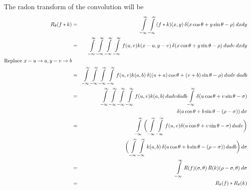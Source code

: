 \documentclass[12pt]{article}
\begin{document}
The radon transform of the convolution will be
\begin{eqnarray*}
	R_\theta(f*k) &=& \int \limits_{-\infty}^\infty \int \limits_{-\infty}^ \infty (f*k)(x, y)\, \delta(x \cos \theta + y \sin \theta - \rho)\: dxdy\\
	&=& \int \limits_{-\infty}^\infty \int \limits_{-\infty}^ \infty \int \limits_{-\infty}^\infty \int \limits_{-\infty}^ \infty f(u, v) k(x-u, y-v)\, \delta(x \cos \theta + y \sin \theta - \rho)\: dudv\: dxdy\\
	\text{Replace } x-u \rightarrow a, y-v \rightarrow b&&\\
	&=& \int \limits_{-\infty}^\infty \int \limits_{-\infty}^ \infty \int \limits_{-\infty}^\infty \int \limits_{-\infty}^ \infty  f(u, v) k(a, b) \, \delta((u+a)\cos\theta + (v+b)\sin \theta - \rho)\: dudv\: dadb\\
	&=& \int \limits_{-\infty}^\infty \int \limits_{-\infty}^ \infty \int \limits_{-\infty}^\infty \int \limits_{-\infty}^ \infty f(u, v) k(a, b) \, dudvdadb \int \limits_{-\infty}^\infty \delta(u\cos\theta + v\sin\theta - \sigma)\\
	&&\hskip 12em\delta(a\cos\theta + b\sin\theta - (\rho-\sigma))\: d\sigma\\
	&=& \int \limits_{-\infty}^\infty \bigg(\int \limits_{-\infty}^\infty\int \limits_{-\infty}^\infty f(u,v) \delta(u\cos\theta + v\sin\theta - \sigma)\, dudv\bigg)\\
	&&\bigg(\int \limits_{-\infty}^\infty\int \limits_{-\infty}^\infty k(a, b)\,\delta(a\cos\theta + b\sin\theta - (\rho-\sigma))\,dadb \bigg)\, d\sigma\\
	&=&  \int \limits_{-\infty}^\infty R(f)(\sigma, \theta) \, R(k)(\rho - \sigma, \theta)\: d\sigma\\
	&=& R_\theta(f) * R_\theta(k)
\end{eqnarray*}
\end{document}

